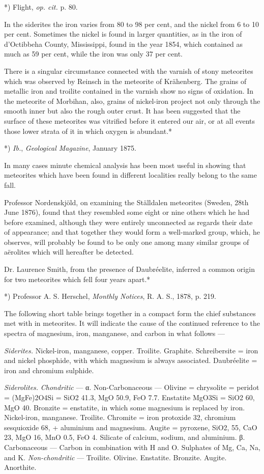 \documentclass[a4paper, 12pt, oneside, polutonikogreek, english]{article}
\begin{document}
*) Flight, \emph{op. cit.} p. 80.

In the siderites the iron varies from 80 to 98 per cent, and the nickel from 6 to 10 per cent. Sometimes the nickel is found in larger quantities, as in the iron of d'Octibbeha County, Mississippi, found in the year 1854, which contained as much as 59 per cent, while the iron was only 37 per cent.

There is a singular circumstance connected with the varnish of stony meteorites which was observed by Reinsch in the meteorite of Krähenberg. The grains of metallic iron and troilite contained in the varnish show no signs of oxidation. In the meteorite of Morbihan, also, grains of nickel-iron project not only through the smooth inner but also the rough outer crust. It has been suggested that the surface of these meteorites was vitrified before it entered our air, or at all events those lower strata of it in which oxygen is abundant.*

*) \emph{Ib.}, \emph{Geological Magazine}, January 1875.

In many cases minute chemical analysis has been most useful in showing that meteorites which have been found in different localities really belong to the same fall.

Professor Nordenskjöld, on examining the Ställdalen meteorites (Sweden, 28th June 1876), found that they resembled some eight or nine others which he had before examined, although they were entirely unconnected as regards their date of appearance; and that together they would form a well-marked group, which, he observes, will probably be found to be only one among many similar groups of aërolites which will hereafter be detected.

Dr. Laurence Smith, from the presence of Daubréelite, inferred a common origin for two meteorites which fell four years apart.*

*) Professor A. S. Herschel, \emph{Monthly Notices}, R. A. S., 1878, p. 219.

The following short table brings together in a compact form the chief substances met with in meteorites. It will indicate the cause of the continued reference to the spectra of magnesium, iron, manganese, and carbon in what follows ---

\emph{Siderites.} 
Nickel-iron, manganese, copper. 
Troilite. Graphite. 
Schreibersite = iron and nickel phosphide, with which magnesium is always associated. 
Daubréelite = iron and chromium sulphide. 

\emph{Siderolites.} 
\emph{Chondritic} --- 
α. Non-Carbonaceous --- 
Olivine = chrysolite = peridot = (MgFe)2O4Si = SiO2 41.3, MgO 50.9, FeO 7.7. 
Enstatite MgO3Si = SiO2 60, MgO 40. 
Bronzite = enstatite, in which some magnesium is replaced by iron. 
Nickel-iron, manganese. 
Troilite. 
Chromite = iron protoxide 32, chromium sesquioxide 68, + aluminium and magnesium. 
Augite = pyroxene, SiO2, 55, CaO 23, MgO 16, MnO 0.5, FeO 4. 
Silicate of calcium, sodium, and aluminium. 
β. Carbonaceous --- 
Carbon in combination with H and O. 
Sulphates of Mg, Ca, Na, and K. 
\emph{Non-chondritic} --- 
Troilite. 
Olivine. 
Enstatite. 
Bronzite. 
Augite. 
Anorthite. 
\end{document}
